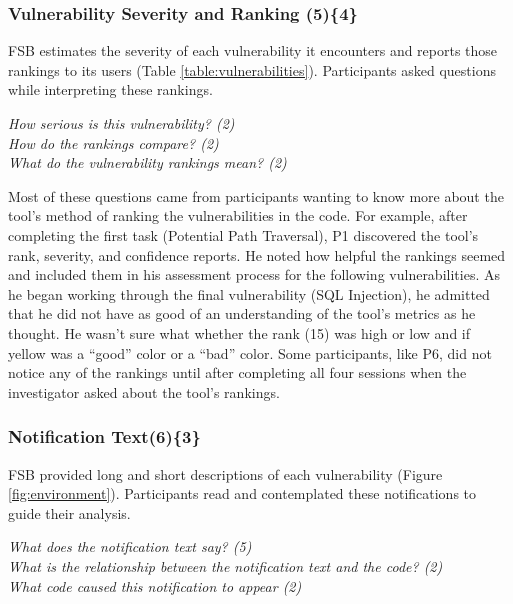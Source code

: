 \documentclass{acm_proc_article-sp}
\begin{document}

\subsubsection{\textbf{Vulnerability Severity and Ranking (5)\{4\}}}\label{bsr}

FSB estimates the severity of each vulnerability it encounters and reports those rankings to its users (Table \ref{table:vulnerabilities}). 
Participants asked questions while interpreting these rankings.


\noindent\emph{How serious is this vulnerability? (2)} \\
\emph{How do the rankings compare? (2)} \\
\emph{What do the vulnerability rankings mean? (2)}

 
Most of these questions came from participants wanting to know more about the tool's method of ranking the vulnerabilities in the code.
For example, after completing the first task (Potential Path Traversal), P1 discovered the tool's rank, severity, and confidence reports. 
He noted how helpful the rankings seemed and included them in his assessment process for the following vulnerabilities.
As he began working through the final vulnerability (SQL Injection), he admitted that he did not have as good of an understanding of the tool's metrics as he thought. 
He wasn't sure what whether the rank (15) was high or low and if yellow was a ``good'' color or a ``bad'' color.
Some participants, like P6, did not notice any of the rankings until after completing all four sessions when the investigator asked about the tool's rankings.


\subsubsection{\textbf{Notification Text(6)\{3\}}}\label{em}

FSB provided long and short descriptions of each vulnerability (Figure \ref{fig:environment}). 
Participants read and contemplated these notifications to guide their analysis.


\noindent\emph{What does the notification text say? (5)} \\
\emph{What is the relationship between the notification text and the code? (2)} \\
\emph{What code caused this notification to appear (2)} 
\end{document}
